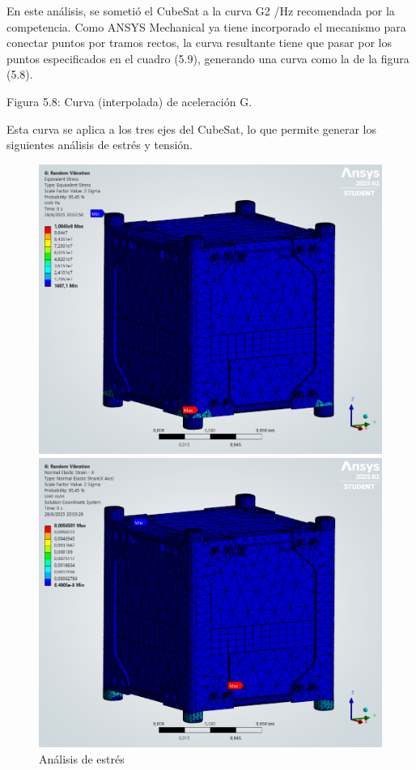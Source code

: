       En este análisis, se sometió el CubeSat a la curva G2 /Hz recomendada por la competencia. Como
      ANSYS Mechanical ya tiene incorporado el mecanismo para conectar puntos por
      tramos rectos, la curva resultante tiene que pasar por los puntos especificados en el cuadro
      (5.9), generando una curva como la de la figura (5.8).


      Figura 5.8: Curva (interpolada) de aceleración G.

      Esta curva se aplica a los tres ejes del CubeSat, lo que permite generar los siguientes
      análisis de estrés y tensión.

      \begin{figure}[h]
        \begin{minipage}{0.5\textwidth}
          \centering
          \includegraphics[width=\textwidth]{image/fem/ansys_cubesat-vibration_stress.png}
          \caption{Análisis de estrés}
          \label{fig:fem_stress}
        \end{minipage}
        \begin{minipage}{0.5\textwidth}
          \centering
          \includegraphics[width=\textwidth]{image/fem/ansys_cubesat-vibration_strain-x.png}

\end{minipage}
\end{figure}
